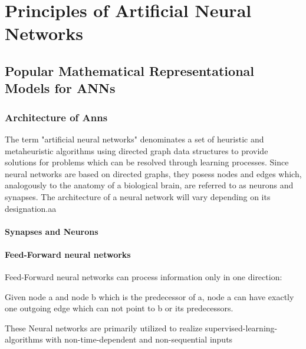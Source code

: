 \chapter{Principles of Artificial Neural Networks}
\section{Popular Mathematical Representational Models for ANNs}
\subsection{Architecture of Anns}
The term "artificial neural networks" denominates a set of heuristic and metaheuristic algorithms using directed graph data structures to provide solutions for problems which can be resolved through learning processes. Since neural networks are based on directed graphs, they posess nodes and edges which, analogously to the anatomy of a biological brain, are referred to as neurons and synapses. The architecture of a neural network will vary depending on its designation.aa
\subsubsection{Synapses and Neurons}
\subsubsection{Feed-Forward neural networks}
  Feed-Forward neural networks can process information only in one direction: \\
  \begin{description}
     Given node a and node b which is the predecessor of a, node a can have exactly one outgoing edge which can not point to b or its predecessors.
  \end{description}
   These Neural networks are primarily utilized to realize supervised-learning-algorithms with non-time-dependent and non-sequential inputs

